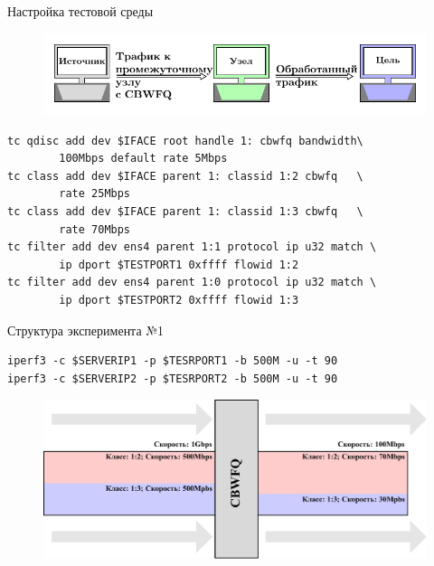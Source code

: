 \documentclass[12pt]{beamer}
\begin{document}
\begin{frame}[fragile]{Настройка тестовой среды}
	\begin{figure}[t]
		\center
    	\includegraphics[scale=0.8]{../text/pdfimages/test_scheme.pdf}
	\end{figure}
{\footnotesize
	\begin{lstlisting}[frame=single]
tc qdisc add dev $IFACE root handle 1: cbwfq bandwidth\
        100Mbps default rate 5Mbps
tc class add dev $IFACE parent 1: classid 1:2 cbwfq   \
        rate 25Mbps
tc class add dev $IFACE parent 1: classid 1:3 cbwfq   \
        rate 70Mbps
tc filter add dev ens4 parent 1:1 protocol ip u32 match \
        ip dport $TESTPORT1 0xffff flowid 1:2
tc filter add dev ens4 parent 1:0 protocol ip u32 match \
        ip dport $TESTPORT2 0xffff flowid 1:3
    \end{lstlisting}
}
%
\end{frame}

\begin{frame}[fragile]{Структура эксперимента №1}

{\footnotesize
	\begin{lstlisting}[frame=single,emph={iperf3},emphstyle={\bfseries}]
iperf3 -c $SERVERIP1 -p $TESRPORT1 -b 500M -u -t 90
iperf3 -c $SERVERIP2 -p $TESRPORT2 -b 500M -u -t 90
    \end{lstlisting}
}%
	\begin{figure}
		\center
    	\includegraphics[scale=0.65]{../text/pdfimages/exp_scheme.pdf}
	\end{figure}
\end{frame}
\end{document}
